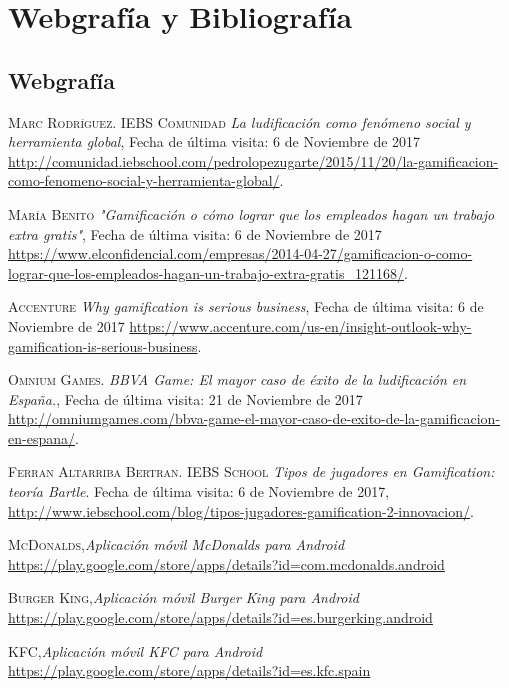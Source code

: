 \documentclass[twoside]{report}
\begin{document}
\chapter{Webgrafía y Bibliografía}
\begin{thebibliography}{a} 
\section{Webgrafía}

 \textsc{Marc Rodríguez. IEBS Comunidad} \textit{La ludificación como fenómeno social y herramienta global}, Fecha de última visita: 6 de Noviembre de 2017 \url{http://comunidad.iebschool.com/pedrolopezugarte/2015/11/20/la-gamificacion-como-fenomeno-social-y-herramienta-global/}.  

 \textsc{María Benito} \textit{"Gamificación o cómo lograr que los empleados hagan un trabajo extra gratis"}, Fecha de última visita: 6 de Noviembre de 2017 \url{https://www.elconfidencial.com/empresas/2014-04-27/gamificacion-o-como-lograr-que-los-empleados-hagan-un-trabajo-extra-gratis_121168/}. 

 \textsc{Accenture} \textit{Why gamification is serious business}, Fecha de última visita: 6 de Noviembre de 2017 \url{https://www.accenture.com/us-en/insight-outlook-why-gamification-is-serious-business}.  

 \textsc{Omnium Games.} \textit{BBVA Game: El mayor caso de éxito de la ludificación en España.}, Fecha de última visita: 21 de Noviembre de 2017 \url{http://omniumgames.com/bbva-game-el-mayor-caso-de-exito-de-la-gamificacion-en-espana/}.  

 \textsc{Ferran Altarriba Bertran. IEBS School} \textit{Tipos de jugadores en Gamification: teoría Bartle}. Fecha de última visita: 6 de Noviembre de 2017, \url{http://www.iebschool.com/blog/tipos-jugadores-gamification-2-innovacion/}.  

 \textsc{McDonalds},\textit{Aplicación móvil McDonalds para Android} \url{https://play.google.com/store/apps/details?id=com.mcdonalds.android}

 \textsc{Burger King},\textit{Aplicación móvil Burger King para Android} \url{https://play.google.com/store/apps/details?id=es.burgerking.android}

 \textsc{KFC},\textit{Aplicación móvil KFC para Android} \url{https://play.google.com/store/apps/details?id=es.kfc.spain}


\end{thebibliography}
\end{document}
